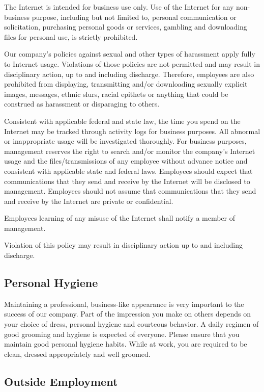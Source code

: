 \documentclass{book}
\begin{document}
The Internet is intended for business use only. Use of the Internet for any non-business purpose, including but not limited to, personal communication or solicitation, purchasing personal goods or services, gambling and downloading files for personal use, is strictly prohibited.

Our company's policies against sexual and other types of harassment apply fully to Internet usage. Violations of those policies are not permitted and may result in disciplinary action, up to and including discharge. Therefore, employees are also prohibited from displaying, transmitting and/or downloading sexually explicit images, messages, ethnic slurs, racial epithets or anything that could be construed as harassment or disparaging to others.

Consistent with applicable federal and state law, the time you spend on the Internet may be tracked through activity logs for business purposes. All abnormal or inappropriate usage will be investigated thoroughly. For business purposes, management reserves the right to search and/or monitor the company's Internet usage and the files/transmissions of any employee without advance notice and consistent with applicable state and federal laws. Employees should expect that communications that they send and receive by the Internet will be disclosed to management. Employees should not  assume that communications that they send and receive by the Internet are private or confidential.

Employees learning of any misuse of the Internet shall notify a member of management.

Violation of this policy may result in disciplinary action up to and including discharge.

\subsection{Personal Hygiene}

Maintaining a professional, business-like appearance is very important to the success of our company. Part of the impression you make on others depends on your choice of dress, personal hygiene and courteous behavior. A daily regimen of good grooming and hygiene is expected of everyone. Please ensure that you maintain good personal hygiene habits. While at work, you are required to be clean, dressed appropriately and well groomed.

\subsection{Outside Employment}
\end{document}
